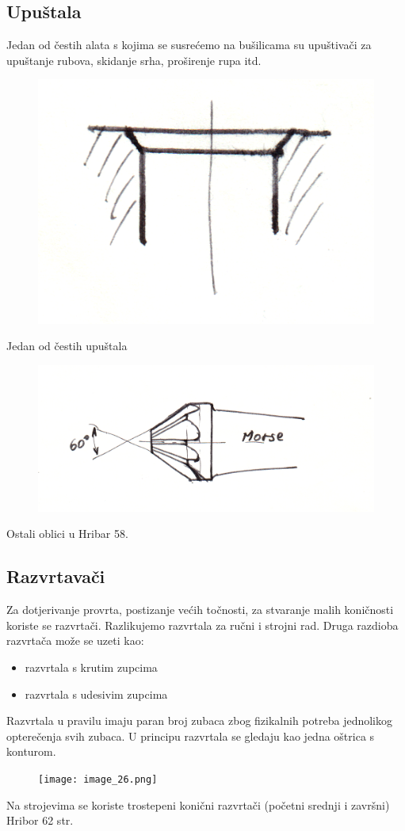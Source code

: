 \documentclass[a4paper,12pt]{article}
\numberwithin{figure}{section}
\begin{document}
\subsection{Upuštala}
Jedan od čestih alata s kojima se susrećemo na bušilicama su upuštivači za upuštanje rubova, skidanje srha, proširenje rupa itd.
\begin{figure}[!h]
\centering
\includegraphics[scale=0.13]{image_25-3.png}
\end{figure}
\FloatBarrier
Jedan od čestih upuštala
\begin{figure}[!h]
\centering
\includegraphics[scale=0.13]{image_25-4.png}
\end{figure}
\FloatBarrier
Ostali oblici u Hribar 58.
\subsection{Razvrtavači}
Za dotjerivanje provrta, postizanje većih točnosti, za stvaranje malih koničnosti koriste se razvrtači. Razlikujemo razvrtala za ručni i strojni rad. Druga razdioba razvrtača može se  uzeti kao:
\begin{itemize}
\item razvrtala s krutim zupcima
\item razvrtala s udesivim zupcima
\end{itemize}
Razvrtala u pravilu imaju paran broj zubaca zbog fizikalnih potreba jednolikog opterečenja svih zubaca. U principu razvrtala se gledaju kao jedna oštrica s konturom.
\begin{figure}[!h]
\centering
\texttt{[image: image\_26.png]}
\end{figure}
\FloatBarrier
\noindent Na strojevima se koriste trostepeni konični razvrtači (početni srednji i završni) Hribor 62 str.
\clearpage
\end{document}
